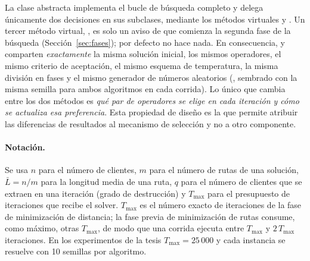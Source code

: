 La clase abstracta  implementa el bucle de búsqueda completo y delega únicamente dos
decisiones en sus subclases, mediante los métodos virtuales  y
. Un tercer método virtual, , es solo un aviso de que comienza
la segunda fase de la búsqueda (Sección~\ref{sec:fases}); por defecto no hace nada. En
consecuencia,  y  comparten
\emph{exactamente} la misma solución inicial, los mismos operadores, el mismo criterio de
aceptación, el mismo esquema de temperatura, la misma división en fases y el mismo generador de números aleatorios
(, sembrado con la misma semilla para ambos algoritmos en cada corrida).
Lo único que cambia entre los dos métodos es \emph{qué par de operadores se elige en cada
iteración y cómo se actualiza esa preferencia}. Esta propiedad de diseño es la que permite
atribuir las diferencias de resultados al mecanismo de selección y no a otro componente.

\paragraph{Notación.} Se usa $n$ para el número de clientes, $m$ para el número de rutas de
una solución, $\bar{L}=n/m$ para la longitud media de una ruta, $q$ para el número de clientes
que se extraen en una iteración (grado de destrucción) y $T_{\max}$ para el presupuesto de
iteraciones que recibe el solver. $T_{\max}$ es el número exacto de iteraciones de la fase de
minimización de distancia; la fase previa de minimización de rutas consume, como máximo, otras
$T_{\max}$, de modo que una corrida ejecuta entre $T_{\max}$ y $2\,T_{\max}$ iteraciones. En
los experimentos de la tesis $T_{\max}=25\,000$ y cada instancia se resuelve con 10 semillas
por algoritmo.
